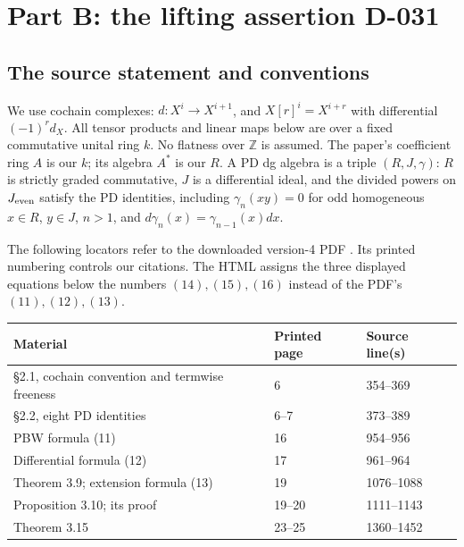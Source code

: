 \section{Part B: the lifting assertion D-031}
\label{sec:B-audit}

\subsection{The source statement and conventions}

We use cochain complexes: $d:X^i\to X^{i+1}$, and
$X[r]^i=X^{i+r}$ with differential $(-1)^r d_X$.
All tensor products and linear maps below are over a fixed commutative
unital ring $k$.  No flatness over $\mathbb Z$ is assumed.
The paper's coefficient ring $A$ is our $k$; its algebra $A^*$ is our $R$.
A PD dg algebra is a triple $(R,J,\gamma)$: $R$ is strictly graded
commutative, $J$ is a differential ideal, and the divided powers on
$J_{\rm even}$ satisfy the PD identities, including
$\gamma_n(xy)=0$ for odd homogeneous $x\in R$, $y\in J$, $n>1$, and
$d\gamma_n(x)=\gamma_{n-1}(x)dx$.

The following locators refer to the downloaded version-4 PDF
\cite{B_CaradotLin2026}.  Its printed numbering controls our citations.
The HTML assigns the three displayed equations below the numbers
$(14),(15),(16)$ instead of the PDF's $(11),(12),(13)$.

\begin{center}
\begin{tabular}{lll}
\hline
Material & Printed page & Source line(s)\\
\hline
\S2.1, cochain convention and termwise freeness & 6 & 354--369\\
\S2.2, eight PD identities & 6--7 & 373--389\\
PBW formula (11) & 16 & 954--956\\
Differential formula (12) & 17 & 961--964\\
Theorem 3.9; extension formula (13) & 19 & 1076--1088\\
Proposition 3.10; its proof & 19--20 & 1111--1143\\
Theorem 3.15 & 23--25 & 1360--1452\\
\hline
\end{tabular}
\end{center}

